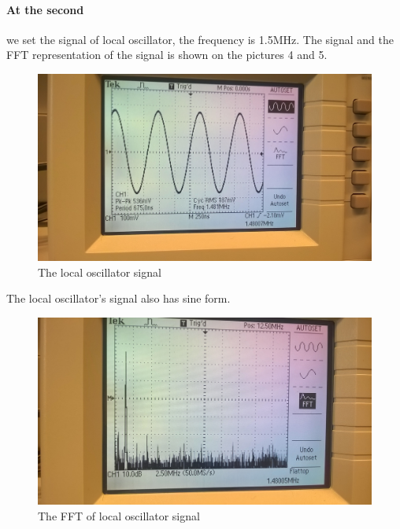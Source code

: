 \documentclass[english]{article}
\begin{document}
\paragraph{At the second} we set the signal of local oscillator, the frequency is 1.5MHz. The signal and the FFT representation of the signal is shown on the pictures 4 and 5.
\begin{figure}[H]
\centerline{\includegraphics[scale=0.1]{AM/6LocalOscilator}}
\caption{The local oscillator signal}
\end{figure}
The local oscillator's signal also has sine form.
\begin{figure}[H]
\centerline{\includegraphics[scale=0.1]{AM/7FFTlocal}}
\caption{The FFT of local oscillator signal}
\end{figure}
\end{document}
